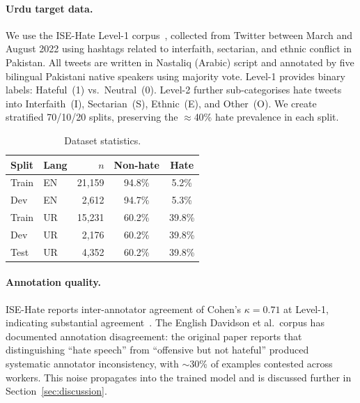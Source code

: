 \documentclass{article}
\begin{document}
\paragraph{Urdu target data.}
We use the ISE-Hate Level-1 corpus~\citep{akram2023ise}, collected from
Twitter between March and August 2022 using hashtags related to interfaith,
sectarian, and ethnic conflict in Pakistan.
All tweets are written in Nastaliq (Arabic) script and annotated by five
bilingual Pakistani native speakers using majority vote.
Level-1 provides binary labels: Hateful~(1) vs.\ Neutral~(0).
Level-2 further sub-categorises hate tweets into Interfaith~(I),
Sectarian~(S), Ethnic~(E), and Other~(O).
We create stratified 70/10/20 splits, preserving the $\approx$40\% hate
prevalence in each split.

\begin{table}[h]
\centering
\caption{Dataset statistics.}
\label{tab:data}
\vskip 0.05in
\begin{small}
\begin{tabular}{llrcc}
\toprule
Split & Lang & $n$ & Non-hate & Hate \\
\midrule
Train & EN   & 21,159 & 94.8\% &  5.2\%  \\
Dev   & EN   &  2,612 & 94.7\% &  5.3\%  \\
\midrule
Train & UR   & 15,231 & 60.2\% & 39.8\% \\
Dev   & UR   &  2,176 & 60.2\% & 39.8\% \\
Test  & UR   &  4,352 & 60.2\% & 39.8\% \\
\bottomrule
\end{tabular}
\end{small}
\end{table}

\paragraph{Annotation quality.}
ISE-Hate reports inter-annotator agreement of Cohen's $\kappa = 0.71$
at Level-1, indicating substantial agreement~\citep{akram2023ise}.
The English Davidson et al.\ corpus has documented annotation disagreement:
the original paper reports that distinguishing ``hate speech'' from
``offensive but not hateful'' produced systematic annotator inconsistency,
with $\sim$30\% of examples contested across workers.
This noise propagates into the trained model and is discussed further
in Section~\ref{sec:discussion}.

\end{document}

